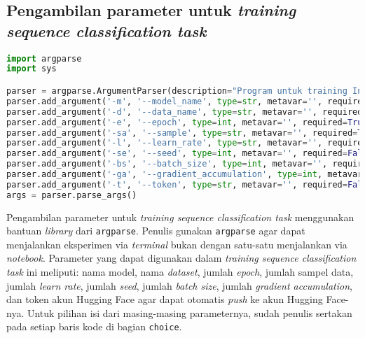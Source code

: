 \subsection{Pengambilan parameter untuk \emph{training sequence classification task}}
\begin{lstlisting}[language=Python, caption=Pengambilan parameter untuk \emph{training sequence classification task}]
import argparse
import sys

parser = argparse.ArgumentParser(description="Program untuk training IndoNLI")
parser.add_argument('-m', '--model_name', type=str, metavar='', required=True, help="Nama model Anda; String; choice=[indolem, indonlu, xlmr, your model choice]")
parser.add_argument('-d', '--data_name', type=str, metavar='', required=True, help="Nama dataset Anda; String; choice=[basic, translated, augmented]")
parser.add_argument('-e', '--epoch', type=int, metavar='', required=True, help="Jumlah epoch Anda; Integer; choice=[all integer]")
parser.add_argument('-sa', '--sample', type=str, metavar='', required=True, help="Jumlah sampling data Anda; Integer; choice=[max, all integer]")
parser.add_argument('-l', '--learn_rate', type=str, metavar='', required=False, help="Jumlah learning rate Anda; Float; choice=[all float]; default=1e-5", default=1e-5)
parser.add_argument('-se', '--seed', type=int, metavar='', required=False, help="Jumlah seed Anda; Integer; choice=[all integer]; default=42", default=42)
parser.add_argument('-bs', '--batch_size', type=int, metavar='', required=False, help="Jumlah batch-size Anda; Integer; choice=[all integer]; default=16", default=16)
parser.add_argument('-ga', '--gradient_accumulation', type=int, metavar='', required=False, help="Jumlah gradient accumulation Anda; Integer; choice=[all integer]; default=8", default=8)
parser.add_argument('-t', '--token', type=str, metavar='', required=False, help="Token Hugging Face Anda; String; choice=[all string token]; default=(TOKEN_HF_muhammadravi251001)", default="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")
args = parser.parse_args()
\end{lstlisting}

Pengambilan parameter untuk \emph{training sequence classification task} menggunakan bantuan \emph{library} dari \texttt{argparse}. Penulis gunakan \texttt{argparse} agar dapat menjalankan eksperimen via \emph{terminal} bukan dengan satu-satu menjalankan via \emph{notebook}. Parameter yang dapat digunakan dalam \emph{training sequence classification task} ini meliputi: nama model, nama \emph{dataset}, jumlah \emph{epoch}, jumlah sampel data, jumlah \emph{learn rate}, jumlah \emph{seed}, jumlah \emph{batch size}, jumlah \emph{gradient accumulation}, dan token akun Hugging Face agar dapat otomatis \emph{push} ke akun Hugging Face-nya. Untuk pilihan isi dari masing-masing parameternya, sudah penulis sertakan pada setiap baris kode di bagian \texttt{choice}.

